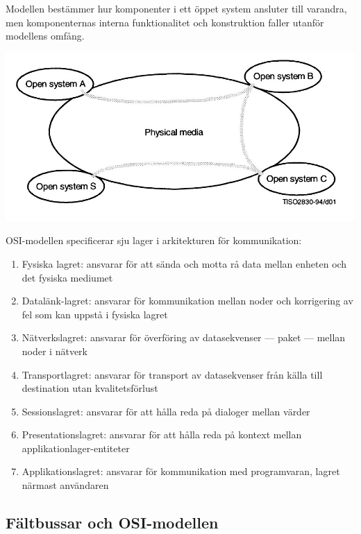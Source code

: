 \documentclass[a4paper,12pt]{article}
\newenvironment{Figure}
  {\par\medskip\noindent\minipage{\linewidth}}
  {\endminipage\par\medskip}
\begin{document}
\begin{multicols}{2}
Modellen bestämmer hur komponenter i ett öppet system ansluter till varandra, men komponenternas interna funktionalitet och konstruktion faller utanför modellens omfång. 

\begin{Figure}
	\centering
	\includegraphics[width=\linewidth]{osianslutningar}
\end{Figure}

OSI-modellen specificerar sju lager i arkitekturen för kommunikation:

\begin{enumerate}[label={\bfseries(\arabic*)}]
	\item Fysiska lagret: ansvarar för att sända och motta rå data mellan enheten och det fysiska mediumet
	\item Datalänk-lagret: ansvarar för kommunikation mellan noder och korrigering av fel som kan uppstå i fysiska lagret
	\item Nätverkslagret: ansvarar för överföring av datasekvenser --- paket --- mellan noder i nätverk
	\item Transportlagret: ansvarar för transport av datasekvenser från källa till destination utan kvalitetsförlust
	\item Sessionslagret: ansvarar för att hålla reda på dialoger mellan värder
	\item Presentationslagret: ansvarar för att hålla reda på kontext mellan applikationlager-entiteter 
	\item Applikationslagret: ansvarar för kommunikation med programvaran, lagret närmast användaren
\end{enumerate}

\subsection{Fältbussar och OSI-modellen}


\end{multicols}
\end{document}
